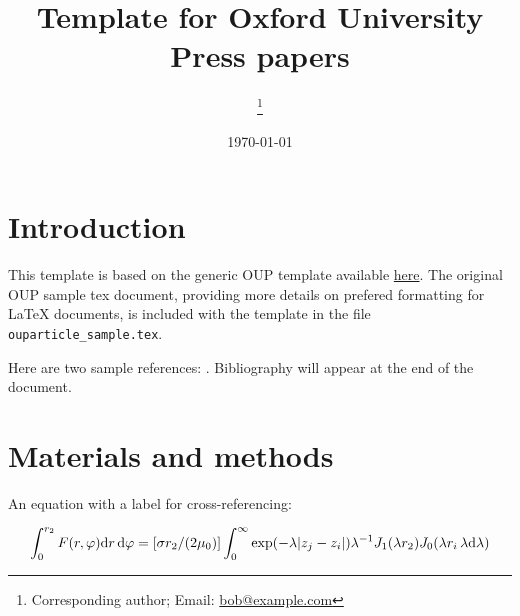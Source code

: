 \documentclass[12pt,halfline,a4paper,]{ouparticle}
\begin{document}
\title{Template for Oxford University Press papers}

\author{%
\address{Some Institute of Technology}
\and
{}\address{Another University}\thanks{Corresponding author; Email: \href{mailto:bob@example.com}{bob@example.com}}
\and
{}\address{Another University}
\and
{}\address{Some Institute of Technology}
}


\date{\today}


\maketitle



\hypertarget{introduction}{%
\section{Introduction}\label{introduction}}

This template is based on the generic OUP template available
\href{https://academic.oup.com/icesjms/pages/General_Instructions}{here}.
The original OUP sample tex document, providing more details on prefered
formatting for LaTeX documents, is included with the template in the
file \texttt{ouparticle\_sample.tex}.

Here are two sample references: \citeauthor{Feynman1963118}
\citetext{\citeyear{Feynman1963118}; \citealp{Dirac1953888}}.
Bibliography will appear at the end of the document.

\hypertarget{materials-and-methods}{%
\section{Materials and methods}\label{materials-and-methods}}

An equation with a label for cross-referencing:

\begin{equation}\label{eq:eq1}
\int^{r_2}_0 F(r,\varphi){\rm d}r\,{\rm d}\varphi = [\sigma r_2/(2\mu_0)]
\int^{\infty}_0\exp(-\lambda|z_j-z_i|)\lambda^{-1}J_1 (\lambda r_2)J_0
(\lambda r_i\,\lambda {\rm d}\lambda)
\end{equation}
\end{document}

